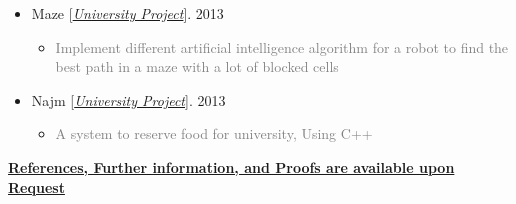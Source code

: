 \documentclass[10pt,a4paper,sans]{moderncv} %
\begin{document}
\begin{itemize}
		\item Maze [\href{https://sbu.ac.ir/Cols/CSE/Pages/default.aspx/}{\emph{University Project}}]. \hfill 2013
		\begin{itemize}
			\item \textcolor{gray} {Implement different artificial intelligence algorithm for a robot to find the best path in a maze with a lot of blocked cells}
		\end{itemize}

		\item Najm [\href{https://sbu.ac.ir/Cols/CSE/Pages/default.aspx/}{\emph{University Project}}]. \hfill 2013
		\begin{itemize}
			\item \textcolor{gray} { A system to reserve  food for university, Using C++}
		\end{itemize}


	\end{itemize}
	
	


	
	\vspace{0.3em}
	\centerline{\underline{\textbf{	\faExclamationCircle \hspace{0.5 pt} References, Further information, and Proofs are available upon Request}}}
	
\end{document}
